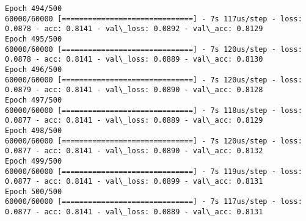 \documentclass[11pt]{article}
\begin{document}
\begin{Verbatim}[commandchars=\\\{\}]
Epoch 494/500
60000/60000 [==============================] - 7s 117us/step - loss: 0.0878 - acc: 0.8141 - val\_loss: 0.0892 - val\_acc: 0.8129
Epoch 495/500
60000/60000 [==============================] - 7s 120us/step - loss: 0.0878 - acc: 0.8141 - val\_loss: 0.0889 - val\_acc: 0.8130
Epoch 496/500
60000/60000 [==============================] - 7s 120us/step - loss: 0.0879 - acc: 0.8141 - val\_loss: 0.0890 - val\_acc: 0.8128
Epoch 497/500
60000/60000 [==============================] - 7s 118us/step - loss: 0.0877 - acc: 0.8141 - val\_loss: 0.0889 - val\_acc: 0.8129
Epoch 498/500
60000/60000 [==============================] - 7s 120us/step - loss: 0.0877 - acc: 0.8141 - val\_loss: 0.0890 - val\_acc: 0.8132
Epoch 499/500
60000/60000 [==============================] - 7s 119us/step - loss: 0.0877 - acc: 0.8141 - val\_loss: 0.0899 - val\_acc: 0.8131
Epoch 500/500
60000/60000 [==============================] - 7s 117us/step - loss: 0.0877 - acc: 0.8141 - val\_loss: 0.0889 - val\_acc: 0.8131

    \end{Verbatim}
\end{document}
